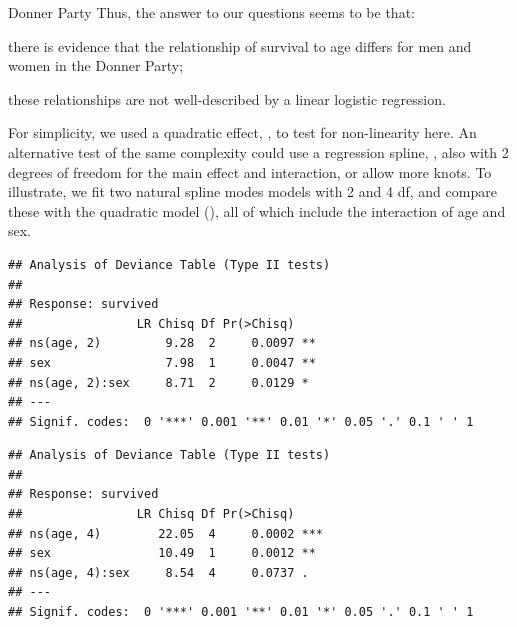 \documentclass[11pt]{book}
\renewenvironment{knitrout}{\small\renewcommand{\baselinestretch}{.85}}{} %
\begin{document}
\begin{Example}[donner1]{Donner Party}
Thus, the answer to our questions seems to be that:
\begin{seriate}
 \item there is evidence that the relationship of survival to age differs
 for men and women in the Donner Party;
 \item these relationships are not well-described by a linear logistic
 regression.
\end{seriate}

For simplicity, we used a quadratic effect, , to test for
non-linearity here.  An alternative test of the same complexity 
could use a regression spline, , also with 2 degrees of
freedom for the main effect and interaction, or allow more knots.
To illustrate, we fit two natural spline modes models with 2 and 4 df,
and compare these with the quadratic model (),
all of which include the interaction of age and sex.

\begin{knitrout}
\color{fgcolor}\begin{kframe}
\begin{alltt}
 \hlkwb{<-}  \hlopt{~} \hlstd{)} \hlopt{*}  
\end{alltt}
\begin{verbatim}
## Analysis of Deviance Table (Type II tests)
## 
## Response: survived
##                LR Chisq Df Pr(>Chisq)   
## ns(age, 2)         9.28  2     0.0097 **
## sex                7.98  1     0.0047 **
## ns(age, 2):sex     8.71  2     0.0129 * 
## ---
## Signif. codes:  0 '***' 0.001 '**' 0.01 '*' 0.05 '.' 0.1 ' ' 1
\end{verbatim}
\begin{alltt}
 \hlkwb{<-}  \hlopt{~} \hlstd{)} \hlopt{*}  
\end{alltt}
\begin{verbatim}
## Analysis of Deviance Table (Type II tests)
## 
## Response: survived
##                LR Chisq Df Pr(>Chisq)    
## ns(age, 4)        22.05  4     0.0002 ***
## sex               10.49  1     0.0012 ** 
## ns(age, 4):sex     8.54  4     0.0737 .  
## ---
## Signif. codes:  0 '***' 0.001 '**' 0.01 '*' 0.05 '.' 0.1 ' ' 1
\end{verbatim}
\begin{alltt}
\hlstd{(}
\end{alltt}



\end{kframe}
\end{knitrout}
\end{Example}
\end{document}
